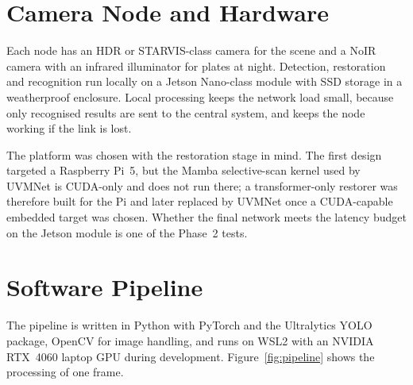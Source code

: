 \section{Camera Node and Hardware}

Each node has an HDR or STARVIS-class camera for the scene and a NoIR camera
with an infrared illuminator for plates at night. Detection, restoration and
recognition run locally on a Jetson Nano-class module with SSD storage in a
weatherproof enclosure. Local processing keeps the network load small, because
only recognised results are sent to the central system, and keeps the node
working if the link is lost.

The platform was chosen with the restoration stage in mind. The first design
targeted a Raspberry Pi~5, but the Mamba selective-scan kernel used by UVMNet
is CUDA-only and does not run there; a transformer-only restorer was
therefore built for the Pi and later replaced by UVMNet once a CUDA-capable
embedded target was chosen. Whether the final network meets the latency budget
on the Jetson module is one of the Phase~2 tests.

\section{Software Pipeline}

The pipeline is written in Python with PyTorch and the Ultralytics YOLO
package, OpenCV for image handling, and runs on WSL2 with an NVIDIA RTX~4060
laptop GPU during development. Figure~\ref{fig:pipeline} shows the processing
of one frame.

